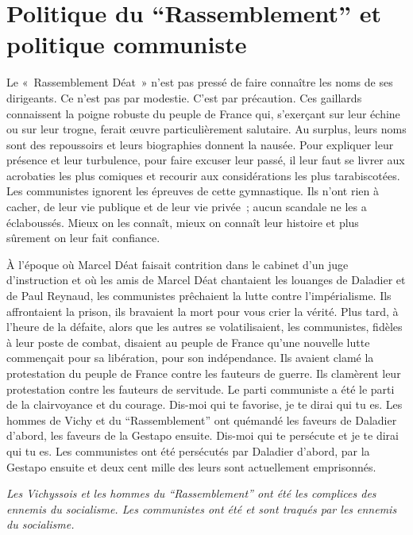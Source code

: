 \documentclass[french,twoside]{book} %
\begin{document}
\section[{Politique du “Rassemblement” et politique communiste}]{Politique du “Rassemblement” et politique communiste}
\noindent Le « Rassemblement Déat » n’est pas pressé de faire connaître les noms de ses dirigeants. Ce n’est pas par modestie. C’est par précaution. Ces gaillards connaissent la poigne robuste du peuple de France qui, s’exerçant sur leur échine ou sur leur trogne, ferait œuvre particulièrement salutaire. Au surplus, leurs noms sont des repoussoirs et leurs biographies donnent la nausée. Pour expliquer leur présence et leur turbulence, pour faire excuser leur passé, il leur faut se livrer aux acrobaties les plus comiques et recourir aux considérations les plus tarabiscotées. Les communistes ignorent les épreuves de cette gymnastique. Ils n’ont rien à cacher, de leur vie publique et de leur vie privée ; aucun scandale ne les a éclaboussés. Mieux on les connaît, mieux on connaît leur histoire et plus sûrement on leur fait confiance.\par
À l’époque où Marcel Déat faisait contrition dans le cabinet d’un juge d’instruction et où les amis de Marcel Déat chantaient les louanges de Daladier et de Paul Reynaud, les communistes prêchaient la lutte contre l’impérialisme. Ils affrontaient la prison, ils bravaient la mort pour vous crier la vérité. Plus tard, à l’heure de la défaite, alors que les autres se volatilisaient, les communistes, fidèles à leur poste de combat, disaient au peuple de France qu’une nouvelle lutte commençait pour sa libération, pour son indépendance. Ils avaient clamé la protestation du peuple de France contre les fauteurs de guerre. Ils clamèrent leur protestation contre les fauteurs de servitude. Le parti communiste a été le parti de la clairvoyance et du courage. Dis-moi qui te favorise, je te dirai qui tu es. Les hommes de Vichy et du “Rassemblement” ont quémandé les faveurs de Daladier d’abord, les faveurs de la Gestapo ensuite. Dis-moi qui te persécute et je te dirai qui tu es. Les communistes ont été persécutés par Daladier d’abord, par la Gestapo ensuite et deux cent mille des leurs sont actuellement emprisonnés.\par
{\itshape Les Vichyssois et les hommes du “Rassemblement” ont été les complices des ennemis du socialisme. Les communistes ont été et sont traqués par les ennemis du socialisme.}\par
\end{document}
